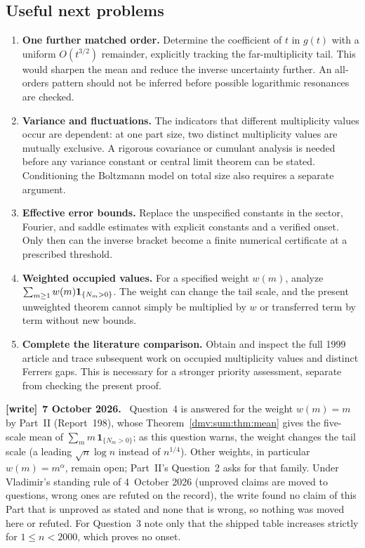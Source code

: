 \documentclass[11pt,letterpaper]{article}
\numberwithin{equation}{section}
\theoremstyle{definition}\newtheorem{definition}[theorem]{Definition}
\theoremstyle{remark}\newtheorem{remark}[theorem]{Remark}
\newenvironment{writenote}[1][]{\par\smallskip\begingroup\small
 \noindent\textbf{[write]}\if\relax\detokenize{#1}\relax\else~\textbf{#1.}\fi\ }%
 {\par\endgroup\smallskip}
\begin{document}
\subsection{Useful next problems}
\begin{enumerate}[leftmargin=*,itemsep=5pt]
\item \textbf{One further matched order.} Determine the coefficient of $t$ in $g(t)$ with a uniform $O(t^{3/2})$ remainder, explicitly tracking the far-multiplicity tail. This would sharpen the mean and reduce the inverse uncertainty further. An all-orders pattern should not be inferred before possible logarithmic resonances are checked.
\item \textbf{Variance and fluctuations.} The indicators that different multiplicity values occur are dependent: at one part size, two distinct multiplicity values are mutually exclusive. A rigorous covariance or cumulant analysis is needed before any variance constant or central limit theorem can be stated. Conditioning the Boltzmann model on total size also requires a separate argument.
\item \textbf{Effective error bounds.} Replace the unspecified constants in the sector, Fourier, and saddle estimates with explicit constants and a verified onset. Only then can the inverse bracket become a finite numerical certificate at a prescribed threshold.
\item \textbf{Weighted occupied values.} For a specified weight $w(m)$, analyze $\sum_{m\ge1}w(m){\bf1}_{\{N_m>0\}}$. The weight can change the tail scale, and the present unweighted theorem cannot simply be multiplied by $w$ or transferred term by term without new bounds.
\item \textbf{Complete the literature comparison.} Obtain and inspect the full 1999 article and trace subsequent work on occupied multiplicity values and distinct Ferrers gaps. This is necessary for a stronger priority assessment, separate from checking the present proof.
\end{enumerate}
\begin{writenote}[7 October 2026]
Question~4 is answered for the weight $w(m)=m$ by Part~II (Report~198), whose
Theorem~\ref{dmv:sum:thm:mean} gives the five-scale mean of
$\sum_m m\,\mathbf 1_{\{N_m>0\}}$; as this question warns, the weight changes
the tail scale (a leading $\sqrt n\log n$ instead of $n^{1/4}$). Other weights,
in particular $w(m)=m^\alpha$, remain open; Part~II's Question~2 asks for that
family. Under Vladimir's standing rule of 4~October 2026 (unproved claims are
moved to questions, wrong ones are refuted on the record), the write found no
claim of this Part that is unproved as stated and none that is wrong, so
nothing was moved here or refuted. For Question~3 note only that the shipped
table increases strictly for $1\le n<2000$, which proves no onset.
\end{writenote}
\end{document}
